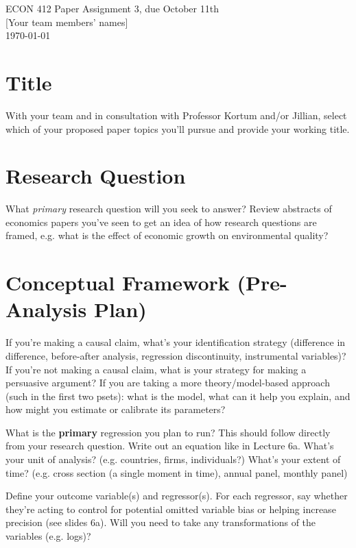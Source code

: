  \noindent
\begin{minipage}[t]{.8\textwidth}
\raggedright
	\Large ECON 412 Paper Assignment 3, due October 11th \\
 	\large [Your team members' names] \\
 	\today \\[1.5em] %
\end{minipage}%


\section{Title}
With your team and in consultation with Professor Kortum and/or Jillian, select which of your proposed paper topics you’ll pursue and provide your working title.

\section{Research Question}

What \textit{primary} research question will you seek to answer? Review abstracts of economics papers you’ve seen to get an idea of how research questions are framed, e.g.  what is the effect of economic growth on environmental quality?

\section{Conceptual Framework (Pre-Analysis Plan)}

If you’re making a causal claim, what’s your identification strategy (difference in difference, before-after analysis, regression discontinuity, instrumental variables)? If you’re not making a causal claim, what is your strategy for making a persuasive argument? If you are taking a more theory/model-based approach (such in the first two psets):  what is the model, what can it help you explain, and how might you estimate or calibrate its parameters?

What is the \textbf{primary} regression you plan to run? This should follow directly from your research question. Write out an equation like in Lecture 6a. What’s your unit of analysis? (e.g. countries, firms, individuals?) What’s your extent of time? (e.g. cross section (a single moment in time), annual panel, monthly panel) 

Define your outcome variable(s) and regressor(s). For each regressor, say whether they’re acting to control for potential omitted variable bias or helping increase precision (see slides 6a). Will you need to take any transformations of the variables (e.g. logs)?


